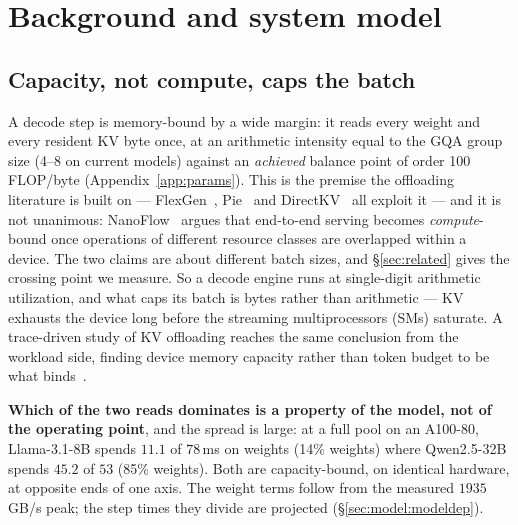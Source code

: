 %
%

\section{Background and system model}
\label{sec:background}

\subsection{Capacity, not compute, caps the batch}
\label{sec:background:capacity}

A decode step is memory-bound by a wide margin: it reads every weight and every
resident KV byte once, at an arithmetic intensity equal to the GQA group size
(4--8 on current models) against an \emph{achieved} balance point of order 100
FLOP/byte (Appendix~\ref{app:params}). This is the premise the offloading
literature is built on --- FlexGen~\cite{flexgen}, Pie~\cite{pie} and
DirectKV~\cite{directkv} all exploit it --- and it is not unanimous:
NanoFlow~\cite{nanoflow} argues that end-to-end serving becomes
\emph{compute}-bound once operations of different resource classes are
overlapped within a device. The two claims are about different batch sizes, and
\S\ref{sec:related} gives the crossing point we measure. So a decode engine runs at single-digit
arithmetic utilization, and what caps its batch is bytes rather than arithmetic
--- KV exhausts the device long before the streaming multiprocessors (SMs)
saturate. A trace-driven study of KV offloading reaches the same conclusion from
the workload side, finding device memory capacity rather than token budget to be
what binds~\cite{bottlenecks}.

\textbf{Which of the two reads dominates is a property of the model, not of the
operating point}, and the spread is large: at a full pool on an A100-80,
Llama-3.1-8B spends $11.1$ of $78$\,ms on weights (14\% weights) where
Qwen2.5-32B spends $45.2$ of $53$ (85\% weights). Both are capacity-bound, on
identical hardware, at opposite ends of one axis. The weight terms follow from
the measured $1935$\,GB/s peak; the step times they divide are projected
(\S\ref{sec:model:modeldep}).

